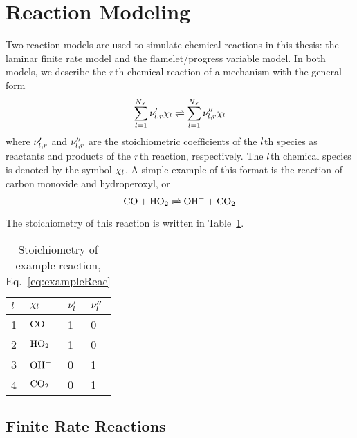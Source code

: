 \section{Reaction Modeling}

Two reaction models are used to simulate chemical reactions in this thesis: the laminar finite rate model and the flamelet/progress variable model. In both models, we describe the $r$th chemical reaction of a mechanism with the general form
%
\begin{equation}
	\specSumAll \stoichCoefSpecReac' \chi_{\specIdx} \xrightleftharpoons[]{} \specSumAll \stoichCoefSpecReac'' \chi_{\specIdx}
\end{equation}
%
where $\nu_{l,r}'$ and $\nu_{l,r}''$ are the stoichiometric coefficients of the $l$th species as reactants and products of the $r$th reaction, respectively. The $l$th chemical species is denoted by the symbol $\chi_{l}$. A simple example of this format is the reaction of carbon monoxide and hydroperoxyl, or
%
\begin{equation}\label{eq:exampleReac}
	\carbonmonox + \hydroperoxyl \xrightleftharpoons[]{} \hydroxide + \carbondiox
\end{equation}
%
The stoichiometry of this reaction is written in Table~\ref{tab:exampleReac}.

\begin{table}
	\centering
	\setlength{\tabcolsep}{12pt}
	\begin{tabular}{llll}
		\toprule
		$l$ & $\chi_{l}$ & $\nu_{l}'$ & $\nu_{l}''$ \\
		\midrule
		1 & $\text{CO}$ & 1 & 0 \\
		2 & $\text{HO}_2$ & 1 & 0 \\
		3 & $\text{OH}^{-}$ & 0 & 1 \\
		4 & $\text{CO}_2$ & 0 & 1 \\
		\bottomrule
	\end{tabular}
	\caption{\label{tab:exampleReac}Stoichiometry of example reaction, Eq.~\ref{eq:exampleReac}}
\end{table}

\subsection{Finite Rate Reactions}\label{sec:finiterate}

